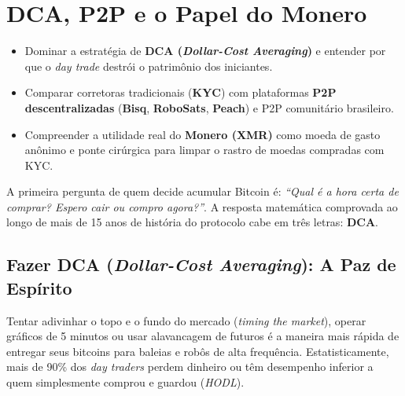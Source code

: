 \documentclass{pousadaguide}
\begin{document}
\chapter{DCA, P2P e o Papel do Monero}

\begin{missao}
\begin{itemize}
  \item Dominar a estratégia de \textbf{DCA (\emph{Dollar-Cost Averaging})} e entender por que o \emph{day trade} destrói o patrimônio dos iniciantes.
  \item Comparar corretoras tradicionais (\textbf{KYC}) com plataformas \textbf{P2P descentralizadas} (\textbf{Bisq}, \textbf{RoboSats}, \textbf{Peach}) e P2P comunitário brasileiro.
  \item Compreender a utilidade real do \textbf{Monero (XMR)} como moeda de gasto anônimo e ponte cirúrgica para limpar o rastro de moedas compradas com KYC.
\end{itemize}
\end{missao}

A primeira pergunta de quem decide acumular Bitcoin é: \emph{``Qual é a hora certa de comprar? Espero cair ou compro agora?''}. A resposta matemática comprovada ao longo de mais de 15 anos de história do protocolo cabe em três letras: \textbf{DCA}.

\section{Fazer DCA (\emph{Dollar-Cost Averaging}): A Paz de Espírito}

Tentar adivinhar o topo e o fundo do mercado (\emph{timing the market}), operar gráficos de 5 minutos ou usar alavancagem de futuros é a maneira mais rápida de entregar seus bitcoins para baleias e robôs de alta frequência. Estatisticamente, mais de 90\% dos \emph{day traders} perdem dinheiro ou têm desempenho inferior a quem simplesmente comprou e guardou (\emph{HODL}).
\end{document}
